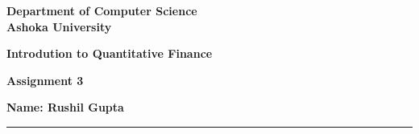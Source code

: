 \documentclass[a4paper]{article}
\begin{document}
\begin{center}
{\large \bf \color{red}  Department of Computer Science} \\
{\large \bf \color{red}  Ashoka University} \\

\vspace{0.1in}

{\large \bf \color{blue}  Introdution to Quantitative Finance}

\vspace{0.05in}

    { \bf \color{YellowOrange} Assignment 3}
\end{center}
\medskip

\hfill {\textbf{Name: Rushil Gupta} }

\bigskip
\hrule


\end{document}
